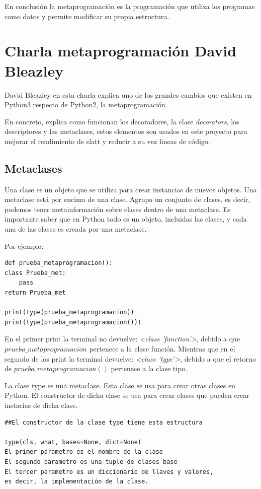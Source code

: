 \documentclass{cosas/tfg_domingo}
\begin{document}
En conclusión la metaprogramación es la programación que utiliza los programas como datos y permite modificar su propia estructura. \citep{silva2018metaprogramacion}

\section{Charla metaprogramación David Bleazley}

David Bleazley en esta charla explica uno de los grandes cambios que existen en Python3 respecto de Python2, la metaprogramación.\citep{David}

En concreto, explica como funcionan los decoradores, la clase \textit{decorators}, los descriptores y las metaclases, estos elementos son usados en este proyecto para mejorar el rendimiento de slatt y reducir a su vez lineas de código.

\subsection{Metaclases}
Una clase es un objeto que se utiliza para crear instancias de nuevos objetos.
Una metaclase está por encima de una clase. Agrupa un conjunto de clases, es decir, podemos tener metainformación sobre clases dentro de una metaclase. Es importante saber que en Python todo es un objeto, incluidas las clases, y cada una de las clases es creada por una metaclase.

\hfill

Por ejemplo:

\begin{verbatim}
def prueba_metaprogramacion():
class Prueba_met:
    pass
return Prueba_met

print(type(prueba_metaprogramacion))
print(type(prueba_metaprogramacion()))
\end{verbatim}

En el primer print la terminal no devuelve: \textit{<class 'function'>}, debido a que $prueba\_metaprogramacion$ pertenece a la clase función. Mientras que en el segundo de los print la terminal devuelve: \textit{<class 'type'>}, debido a que el retorno de $prueba\_metaprogramacion()$ pertenece a la clase tipo.

La clase type es una metaclase. Esta clase se usa para crear otras clases en Python. El constructor de dicha clase se usa para crear clases que pueden crear instacias de dicha clase.

\begin{verbatim}
##El constructor de la clase type tiene esta estructura

type(cls, what, bases=None, dict=None)
El primer parametro es el nombre de la clase
El segundo parametro es una tuple de clases base
El tercer parametro es un diccionario de llaves y valores,
es decir, la implementación de la clase.
\end{verbatim}
\end{document}
